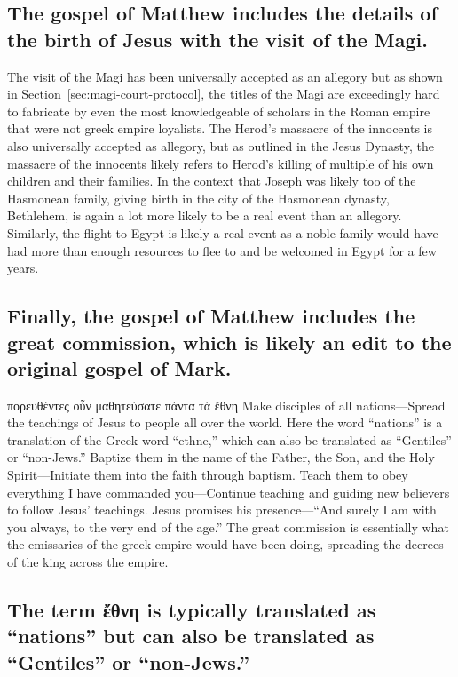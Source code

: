 \subsection{The gospel of Matthew includes the details of the birth of Jesus with the visit of the Magi.}\label{subsec:the-gospel-of-matthew-includes-the-details-of-the-birth-of-jesus-with-the-visit-of-the-magi.}

The visit of the Magi has been universally accepted as an allegory but as shown in Section~\ref{sec:magi-court-protocol}, the titles of the Magi are exceedingly hard to fabricate by even the most knowledgeable of scholars in the Roman empire that were not greek empire loyalists.
The Herod's massacre of the innocents is also universally accepted as allegory, but as outlined in the Jesus Dynasty, the massacre of the innocents likely refers to Herod's killing of multiple of his own children and their families.
In the context that Joseph was likely too of the Hasmonean family, giving birth in the city of the Hasmonean dynasty, Bethlehem, is again a lot more likely to be a real event than an allegory.
Similarly, the flight to Egypt is likely a real event as a noble family would have had more than enough resources to flee to and be welcomed in Egypt for a few years.

\subsection{Finally, the gospel of Matthew includes the great commission, which is likely an edit to the original gospel of Mark.}\label{subsec:finally-the-gospel-of-matthew-includes-the-great-commission-which-is-likely-an-edit-to-the-original-gospel-of-mark.}

πορευθέντες οὖν μαθητεύσατε πάντα τὰ ἔθνη Make disciples of all nations---Spread the teachings of Jesus to people all over the world.
Here the word ``nations'' is a translation of the Greek word ``ethne,'' which can also be translated as ``Gentiles'' or ``non-Jews.'' Baptize them in the name of the Father, the Son, and the Holy Spirit---Initiate them into the faith through baptism.
Teach them to obey everything I have commanded you---Continue teaching and guiding new believers to follow Jesus' teachings.
Jesus promises his presence---``And surely I am with you always, to the very end of the age.'' The great commission is essentially what the emissaries of the greek empire would have been doing, spreading the decrees of the king across the empire.

\subsection{The term ἔθνη is typically translated as ``nations'' but can also be translated as ``Gentiles'' or ``non-Jews.''}\label{subsec:the-term-ux1f14ux3b8ux3bdux3b7-is-typically-translated-as-nations-but-can-also-be-translated-as-gentiles-or-non-jews.}

